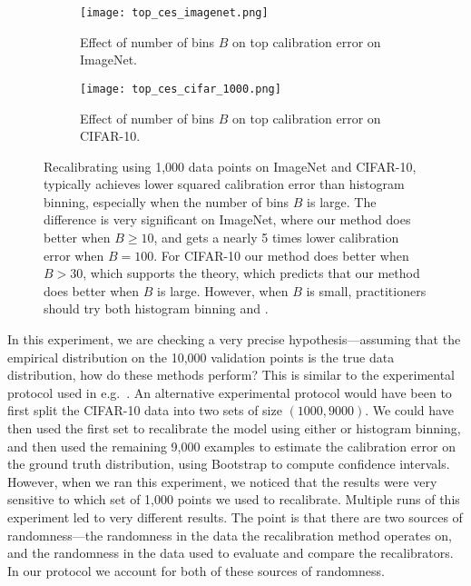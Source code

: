 \begin{figure}
  \centering
  \centering
  	 \begin{subfigure}[b]{0.48\textwidth}
         \centering
         \texttt{[image: top\_ces\_imagenet.png]}
         \caption{Effect of number of bins $B$ on top calibration error on ImageNet.
         }
         \label{fig:imagenet_top_cal_var_red}
     \end{subfigure}
     \hfill
     \begin{subfigure}[b]{0.48\textwidth}
         \centering
         \texttt{[image: top\_ces\_cifar\_1000.png]}
         \caption{Effect of number of bins $B$ on top calibration error on CIFAR-10.
         }
         \label{fig:cifar_top_cal_var_red}
     \end{subfigure}
  \caption{
    Recalibrating using 1,000 data points on ImageNet and CIFAR-10, \ourcal{} typically achieves lower squared calibration error than histogram binning, especially when the number of bins $B$ is large. The difference is very significant on ImageNet, where our method does better when $B \geq 10$, and gets a nearly 5 times lower calibration error when $B = 100$. For CIFAR-10 our method does better when $B > 30$, which supports the theory, which predicts that our method does better when $B$ is large. However, when $B$ is small, practitioners should try both histogram binning and \ourcal{}.
}
  \label{fig:mse_estimators_bins}
\end{figure}

In this experiment, we are checking a very precise hypothesis---assuming that the empirical distribution on the 10,000 validation points is the true data distribution, how do these methods perform? This is similar to the experimental protocol used in e.g.~\cite{brocker2012empirical}.
An alternative experimental protocol would have been to first split the CIFAR-10 data into two sets of size $(1000, 9000)$.
We could have then used the first set to recalibrate the model using either \ourcal{} or histogram binning, and then used the remaining 9,000 examples to estimate the calibration error on the ground truth distribution, using Bootstrap to compute confidence intervals.
However, when we ran this experiment, we noticed that the results were very sensitive to which set of 1,000 points we used to recalibrate.
Multiple runs of this experiment led to very different results.
The point is that there are two sources of randomness---the randomness in the data the recalibration method operates on, and the randomness in the data used to evaluate and compare the recalibrators.
In our protocol we account for both of these sources of randomness.

